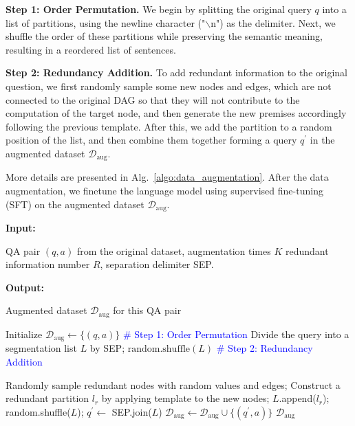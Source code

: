 

\textbf{Step 1: Order Permutation.} We begin by splitting the original query $q$ into a list of partitions, using the newline character ("$\backslash$n") as the delimiter. Next, we shuffle the order of these partitions while preserving the semantic meaning, resulting in a reordered list of sentences. 

\textbf{Step 2: Redundancy Addition.} To add redundant information to the original question, we first randomly sample some new nodes and edges, which are not connected to the original DAG so that they will not contribute to the computation of the target node, and then generate the new premises accordingly following the previous template.
After this, we add the partition to a random position of the list, and then combine them together forming a query $q^\prime$ in the augmented dataset \( \mathcal{D}_\text{aug} \).

More details are presented in Alg.~\ref{algo:data_augmentation}. After the data augmentation, we finetune the language model using supervised fine-tuning (SFT) on the augmented dataset \( \mathcal{D}_\text{aug} \). 


\begin{algorithm}[t]
\caption{\method\ }
{\bfseries Input:} \raggedright QA pair $(q, a)$ from the original dataset, augmentation times $K$ redundant information number $R$, separation delimiter SEP. \par
{\bfseries Output:} \raggedright Augmented dataset \( \mathcal{D}_\text{aug} \) for this QA pair \par
\begin{algorithmic}[1]
\STATE Initialize \( \mathcal{D}_\text{aug} \gets \{(q, a)\}\)
\STATE \textcolor{blue}{\# Step 1: Order Permutation}
\STATE Divide the query into a segmentation list $L$ by SEP;
\STATE $\text{random.shuffle}(L)$
\STATE \textcolor{blue}{\# Step 2: Redundancy Addition}
        
        \STATE Randomly sample redundant nodes with random values and edges;
        \STATE Construct a redundant partition $l_r$ by applying template to the new nodes;
        \STATE $L$.append($l_r$);
    \ENDFOR
\STATE random.shuffle($L$);
\STATE $q^{\prime} \gets$ SEP.join($L$)
\STATE    \( \mathcal{D}_\text{aug} \gets \mathcal{D}_\text{aug} \cup \{(q^\prime, a)\} \)
\ENDFOR
{} \( \mathcal{D}_\text{aug} \)
\end{algorithmic} \label{algo:data_augmentation}
\end{algorithm}

